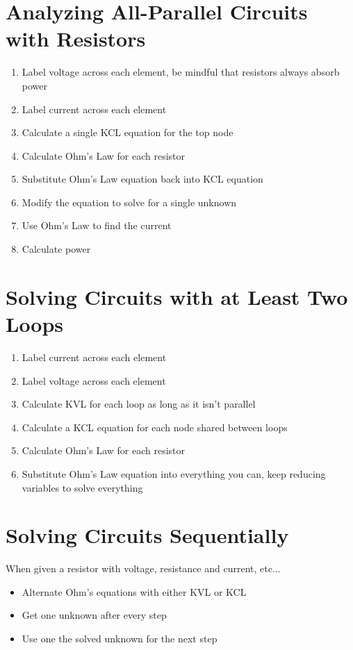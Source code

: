\documentclass{article}
\begin{document}
\section{Analyzing All-Parallel Circuits with Resistors}
\begin{enumerate}
  \item Label voltage across each element, be mindful that resistors always absorb power
  \item Label current across each element
  \item Calculate a single KCL equation for the top node
  \item Calculate Ohm's Law for each resistor
  \item Substitute Ohm's Law equation back into KCL equation
  \item Modify the equation to solve for a single unknown
  \item Use Ohm's Law to find the current
  \item Calculate power
\end{enumerate}

\section{Solving Circuits with at Least Two Loops}
\begin{enumerate}
  \item Label current across each element
  \item Label voltage across each element
  \item Calculate KVL for each loop as long as it isn't parallel
  \item Calculate a KCL equation for each node shared between loops
  \item Calculate Ohm's Law for each resistor
  \item Substitute Ohm's Law equation into everything you can, keep reducing variables to solve everything
\end{enumerate}

\section{Solving Circuits Sequentially}
When given a resistor with voltage, resistance and current, etc...
\begin{itemize}
  \item Alternate Ohm's equations with either KVL or KCL
  \item Get one unknown after every step
  \item Use one the solved unknown for the next step
\end{itemize}
\end{document}

